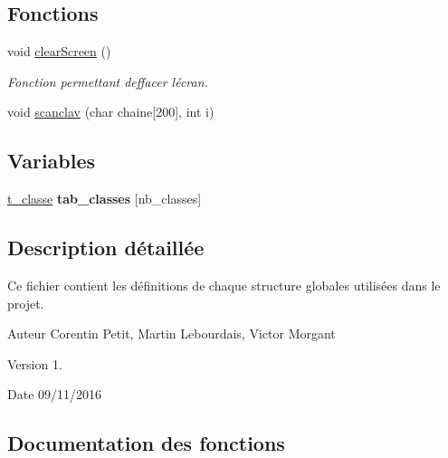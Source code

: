 \subsection*{Fonctions}
\begin{DoxyCompactItemize}
\item 
void \hyperlink{a00022_a9d7e8af417b6d543da691e9c0e2f6f9f}{clear\+Screen} ()
\begin{DoxyCompactList}\small\item\em Fonction permettant d\textquotesingle{}effacer l\textquotesingle{}écran. \end{DoxyCompactList}\item 
void \hyperlink{a00022_a067cc563e0d768fba761fe23d56c5983}{scanclav} (char chaine\mbox{[}200\mbox{]}, int i)
\end{DoxyCompactItemize}
\subsection*{Variables}
\begin{DoxyCompactItemize}
\item 
\hyperlink{a00005}{t\+\_\+classe} {\bfseries tab\+\_\+classes} \mbox{[}nb\+\_\+classes\mbox{]}\hypertarget{a00022_a61d1d67ae5f5040aa12b0bcc9d0e39f8}{}\label{a00022_a61d1d67ae5f5040aa12b0bcc9d0e39f8}

\end{DoxyCompactItemize}


\subsection{Description détaillée}
Ce fichier contient les définitions de chaque structure globales utilisées dans le projet. 

\begin{DoxyAuthor}{Auteur}
Corentin Petit, Martin Lebourdais, Victor Morgant 
\end{DoxyAuthor}
\begin{DoxyVersion}{Version}
1. 
\end{DoxyVersion}
\begin{DoxyDate}{Date}
09/11/2016 
\end{DoxyDate}


\subsection{Documentation des fonctions}
